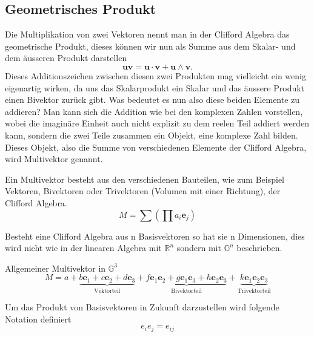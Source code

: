 \subsection{Geometrisches Produkt}
Die Multiplikation von zwei Vektoren nennt man in der Clifford Algebra das geometrische Produkt, dieses können wir nun als Summe aus dem Skalar- und dem äusseren Produkt darstellen
\begin{equation}
    \textbf{u}\textbf{v} = \textbf{u}\cdot \textbf{v} + \textbf{u} \wedge \textbf{v}.
\end{equation}
Dieses Additionszeichen zwischen diesen zwei Produkten mag vielleicht ein wenig eigenartig wirken, da uns das Skalarprodukt ein Skalar und das äussere Produkt einen Bivektor zurück gibt. Was bedeutet es nun also diese beiden Elemente zu addieren?
Man kann sich die Addition wie bei den komplexen Zahlen vorstellen, wobei die imaginäre Einheit auch nicht explizit zu dem reelen Teil addiert werden kann, sondern die zwei Teile zusammen ein Objekt, eine komplexe Zahl bilden. 
Dieses Objekt, also die Summe von verschiedenen Elemente der Clifford Algebra, wird Multivektor genannt.
\begin{definition}
Ein Multivektor besteht aus den verschiedenen Bauteilen, wie zum Beispiel Vektoren, Bivektoren oder Trivektoren (Volumen mit einer Richtung), der Clifford Algebra.
\begin{equation}
    M = \sum \left ( \prod a_i\textbf{e}_j \right)
\end{equation}
\end{definition}
Besteht eine Clifford Algebra aus n Basisvektoren so hat sie n Dimensionen, dies wird nicht wie in der linearen Algebra mit $\mathbb{R}^n$ sondern mit $\mathbb{G}^n$ beschrieben. 
\begin{beispiel}
Allgemeiner Multivektor in $\mathbb{G}^3$
\begin{equation}
    M = a 
    + 
    \underbrace{b\textbf{e}_1 + c\textbf{e}_2 + d\textbf{e}_3}_{\text{Vektorteil}} 
    +
    \underbrace{f\textbf{e}_1\textbf{e}_2 + g\textbf{e}_1\textbf{e}_3 + h\textbf{e}_2\textbf{e}_3 }_{\text{Bivektorteil}} 
    +   
    \underbrace{k\textbf{e}_1\textbf{e}_2\textbf{e}_3}_{\text{Trivektorteil}}
\end{equation}
\end{beispiel}
\begin{definition}
Um das Produkt von Basisvektoren in Zukunft darzustellen wird folgende Notation definiert
    \begin{equation}
        e_ie_j = e_{ij}
    \end{equation}
\end{definition}
